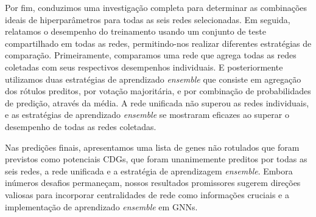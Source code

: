 \documentclass[ppgc, diss, english]{iiufrgs}
\begin{document}
Por fim, conduzimos uma investigação completa para determinar as combinações ideais de hiperparâmetros para todas as seis redes selecionadas. Em seguida, relatamos o desempenho do treinamento usando um conjunto de teste compartilhado em todas as redes, permitindo-nos realizar diferentes estratégias de comparação. Primeiramente, comparamos uma rede que agrega todas as redes coletadas com seus respectivos desempenhos individuais. E posteriormente utilizamos duas estratégias de aprendizado \textit{ensemble} que consiste em agregação dos rótulos preditos, por votação majoritária, e por combinação de probabilidades de predição, através da média. A rede unificada não superou as redes individuais, e as estratégias de aprendizado \textit{ensemble} se mostraram eficazes ao superar o desempenho de todas as redes coletadas.

Nas predições finais, apresentamos uma lista de genes não rotulados que foram previstos como potenciais CDGs, que foram unanimemente preditos por todas as seis redes, a rede unificada e a estratégia de aprendizagem \textit{ensemble}. Embora inúmeros desafios permaneçam, nossos resultados promissores sugerem direções valiosas para incorporar centralidades de rede como informações cruciais e a implementação de aprendizado \textit{ensemble} em GNNs.
\end{document}
